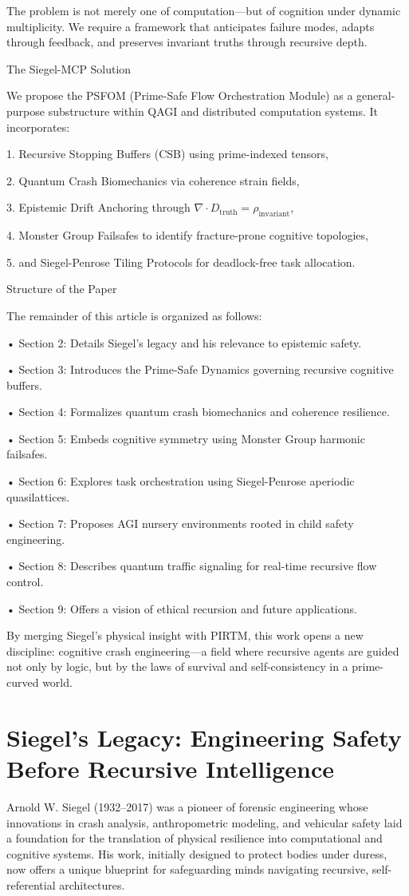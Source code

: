 \documentclass[11pt]{article}
\begin{document}
The problem is not merely one of computation—but of cognition under dynamic multiplicity. We require a framework that anticipates failure modes, adapts through feedback, and preserves invariant truths through recursive depth.

The Siegel-MCP Solution

We propose the PSFOM (Prime-Safe Flow Orchestration Module) as a general-purpose substructure within QAGI and distributed computation systems. It incorporates:

1. Recursive Stopping Buffers (CSB) using prime-indexed tensors,

2. Quantum Crash Biomechanics via coherence strain fields,

3. Epistemic Drift Anchoring through $\nabla \cdot D_{\text{truth}} = \rho_{\text{invariant}}$,

4. Monster Group Failsafes to identify fracture-prone cognitive topologies,

5. and Siegel-Penrose Tiling Protocols for deadlock-free task allocation.

Structure of the Paper

The remainder of this article is organized as follows:

• Section 2: Details Siegel’s legacy and his relevance to epistemic safety.

• Section 3: Introduces the Prime-Safe Dynamics governing recursive cognitive buffers.

• Section 4: Formalizes quantum crash biomechanics and coherence resilience.

• Section 5: Embeds cognitive symmetry using Monster Group harmonic failsafes.

• Section 6: Explores task orchestration using Siegel-Penrose aperiodic quasilattices.

• Section 7: Proposes AGI nursery environments rooted in child safety engineering.

• Section 8: Describes quantum traffic signaling for real-time recursive flow control.

• Section 9: Offers a vision of ethical recursion and future applications.

By merging Siegel’s physical insight with PIRTM, this work opens a new discipline: cognitive crash engineering—a field where recursive agents are guided not only by logic, but by the laws of survival and self-consistency in a prime-curved world.

\section{Siegel’s Legacy: Engineering Safety Before Recursive Intelligence}
Arnold W. Siegel (1932–2017) was a pioneer of forensic engineering whose innovations in crash analysis, anthropometric modeling, and vehicular safety laid a foundation for the translation of physical resilience into computational and cognitive systems. His work, initially designed to protect bodies under duress, now offers a unique blueprint for safeguarding minds navigating recursive, self-referential architectures.
\end{document}
